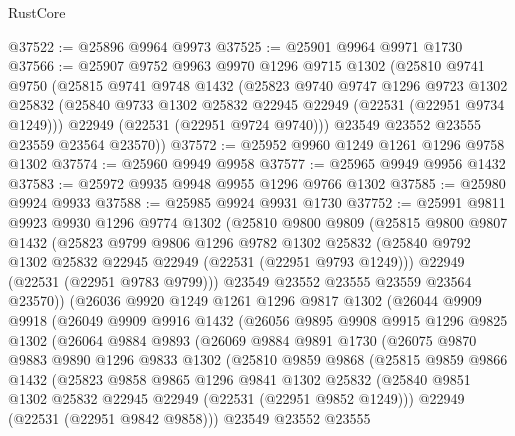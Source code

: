\begin{lexlean}{RustCore}
\begin{coremodule}
@37522 := @25896 @9964 @9973
@37525 := @25901 @9964 @9971 @1730
@37566 := @25907
    @9752
    @9963
    @9970
    @1296
    @9715
    @1302
    (@25810
      @9741
      @9750
      (@25815
        @9741
        @9748
        @1432
        (@25823
          @9740
          @9747
          @1296
          @9723
          @1302
          @25832
          (@25840 @9733 @1302 @25832 @22945 @22949 (@22531 (@22951 @9734 @1249)))
          @22949
          (@22531 (@22951 @9724 @9740)))
        @23549
        @23552
        @23555
        @23559
        @23564
        @23570))
@37572 := @25952 @9960 @1249 @1261 @1296 @9758 @1302
@37574 := @25960 @9949 @9958
@37577 := @25965 @9949 @9956 @1432
@37583 := @25972 @9935 @9948 @9955 @1296 @9766 @1302
@37585 := @25980 @9924 @9933
@37588 := @25985 @9924 @9931 @1730
@37752 := @25991
    @9811
    @9923
    @9930
    @1296
    @9774
    @1302
    (@25810
      @9800
      @9809
      (@25815
        @9800
        @9807
        @1432
        (@25823
          @9799
          @9806
          @1296
          @9782
          @1302
          @25832
          (@25840 @9792 @1302 @25832 @22945 @22949 (@22531 (@22951 @9793 @1249)))
          @22949
          (@22531 (@22951 @9783 @9799)))
        @23549
        @23552
        @23555
        @23559
        @23564
        @23570))
    (@26036
      @9920
      @1249
      @1261
      @1296
      @9817
      @1302
      (@26044
        @9909
        @9918
        (@26049
          @9909
          @9916
          @1432
          (@26056
            @9895
            @9908
            @9915
            @1296
            @9825
            @1302
            (@26064
              @9884
              @9893
              (@26069
                @9884
                @9891
                @1730
                (@26075
                  @9870
                  @9883
                  @9890
                  @1296
                  @9833
                  @1302
                  (@25810
                    @9859
                    @9868
                    (@25815
                      @9859
                      @9866
                      @1432
                      (@25823
                        @9858
                        @9865
                        @1296
                        @9841
                        @1302
                        @25832
                        (@25840 @9851 @1302 @25832 @22945 @22949 (@22531 (@22951 @9852 @1249)))
                        @22949
                        (@22531 (@22951 @9842 @9858)))
                      @23549
                      @23552
                      @23555

\end{coremodule}
\end{lexlean}
